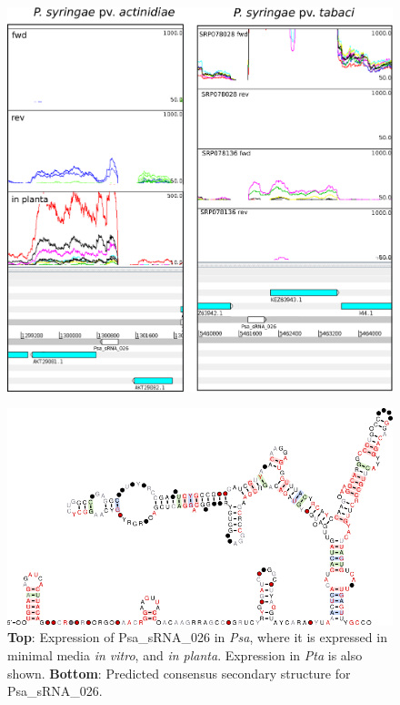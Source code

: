 \begin{figure}[H]
    \centering
\includegraphics[width=0.9\linewidth]{psa/psa_ncRNA/psa_srna_026_exp.png} 
\end{figure}
\begin{figure}[H]
    \centering
\includegraphics[width=0.75\linewidth]{psa/psa_ncRNA/sRNA_026.png}
    \caption[Expression and predicted consensus secondary structure for Psa\_sRNA\_026]{\textbf{Top}: Expression of Psa\_sRNA\_026 in \textit{Psa}, where it is expressed in minimal media \textit{in vitro}, and \textit{in planta}. Expression in \textit{Pta} is also shown. \textbf{Bottom}: Predicted consensus secondary structure for Psa\_sRNA\_026.}
    \label{fig:srna_026}
\end{figure}

